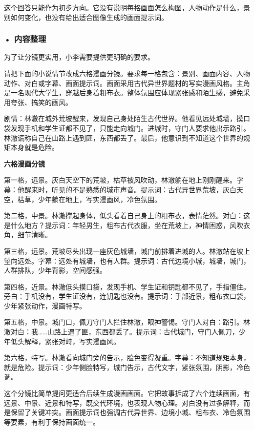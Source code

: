这个回答只能作为初步方向。它没有说明每格画面怎么构图，人物动作是什么，景别如何变化，也没有给出适合图像生成的画面提示词。

\subsubsection*{\textbf{• 内容整理}}

为了让分镜更实用，小李需要提供更明确的要求。

\begin{userbox}
请把下面的小说情节改成六格漫画分镜。要求每一格包含：景别、画面内容、人物动作、对白或字幕、画面提示词。画面采用古代异世界题材的写实漫画风格。主角是一名现代大学生，穿越后身着粗布衣。整体氛围应体现紧张感和陌生感，避免采用夸张、搞笑的画风。

剧情：林澈在城外荒坡醒来，发现自己身处陌生古代世界。他看见远处城墙，摸口袋发现手机和学生证都不见了，只能走向城门。进城时，守门人要求他出示路引。林澈谎称自己在山路上遇到匪，东西都丢了。最后，他意识到不知道这个世界的规矩本身就是危险。
\end{userbox}

\begin{aibox}
\textbf{六格漫画分镜}

第一格，远景。灰白天空下的荒坡，枯草被风吹动，林澈躺在地上刚刚醒来。字幕：他醒来时，听见的不是熟悉的城市声音。提示词：古代异世界荒坡，灰白天空，枯草，少年躺在地上，写实漫画风，冷色氛围。

第二格，中景。林澈撑起身体，低头看着自己身上的粗布衣，表情茫然。对白：这是什么地方？提示词：年轻男生，粗布古代衣服，坐在荒坡上，神情困惑，风吹衣角，细节清晰。

第三格，远景。荒坡尽头出现一座灰色城墙，城门前排着进城的人。林澈站在坡上望向远处。字幕：远处有城墙，也有人群。提示词：古代边境小城，城墙，城门，人群排队，少年背影，空间感强。

第四格，近景。林澈低头摸口袋，发现手机、学生证和钥匙都不见了，手指僵住。旁白：手机没有，学生证没有，连钥匙也没有。提示词：手部近景，粗布衣口袋，少年紧张动作，漫画特写。

第五格，中景。城门口，佩刀守门人拦住林澈，眼神警惕。守门人对白：路引。林澈对白：我……山路上遇了匪，东西都丢了。提示词：古代城门，守门人佩刀，少年低头解释，紧张对峙，写实漫画风。

第六格，特写。林澈看向城门旁的告示，脸色变得凝重。字幕：不知道规矩本身，就是危险。提示词：少年侧脸特写，城门告示，古代文字，紧张氛围，阴影，冷色调。
\end{aibox}

这个分镜比简单提问更适合后续生成漫画画面。它把故事拆成了六个连续画面，有远景、中景、近景和特写，既交代环境，也表现人物心理。对白没有过多解释，而是保留了关键冲突。画面提示词也强调古代异世界、边境小城、粗布衣、冷色氛围等要素，有利于保持画面统一。

